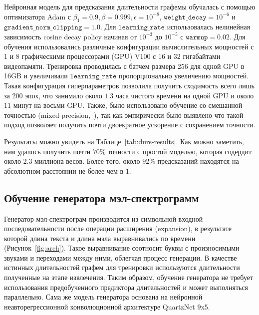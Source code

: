 Нейронная модель для предсказания длительности графемы обучалась с помощью оптимизатора Adam с $\beta_1=0.9,\beta=0.999,\epsilon=10^{-8}$, $\texttt{weight\_decay}={10}^{-6}$ и $\texttt{gradient\_norm\_clipping}=1.0$. Для $\texttt{learning\_rate}$ использовалась нелинейная зависимость cosine decay policy начиная от $10^{-3}$ до $10^{-5}$ с $\texttt{warmup}=0.02$. Для обучения использовались различные конфигурации вычислительных мощностей с 1 и 8 графическими процессорами (GPU) V100 с 16 и 32 гигабайтами видеопамяти. Тренировка проводилась с батчем размера 256 для одной GPU в 16GB и увеличивали $\texttt{learning\_rate}$ пропорционально увеличению мощностей. Такая конфигурация гиперпараметров позволила получить сходимость всего лишь за 200 эпох, что занимало около $1.3$ часа чистого времени на одной GPU и около $11$ минут на восьми GPU. Также, было использовано обучение со смешанной точностью (mixed-precision,~\cite{micikevicius}), так как эмпирически было выявлено что такой подход позволяет получить почти двоекратное ускорение с сохранением точности.

Результаты можно увидеть на Таблице~\ref{tab:durs-results}. Как можно заметить, нам удалось получить почти $70\%$ точности с простой моделью, которая содердит около 2.3 миллиона весов. Более того, около $92\%$ предсказаний находятся на абсолютном расстоянии не более чем в 1.

\subsection{Обучение генератора мэл-спектрограмм}

Генератор мэл-спектрограм производится из символьной входной последовательности после операции расширения (expansion), в результате которой длина текста и длина мэла выравнивались по времени (Рисунок~\ref{fig:arch}). Такое выравнивание соотносит буквы с произносимыми звуками и переходами между ними, облегчая процесс генерации. В качестве истинных длительностей графем для тренировки используются длительности полученные на этапе извлечения. Таким образом, обучение генератора не требует использования предобученного предиктора длительностей и может выполняться параллельно. Сама же модель генератора основана на нейронной неавторегрессионной конволюционной архитектуре QuartzNet 9x5.


